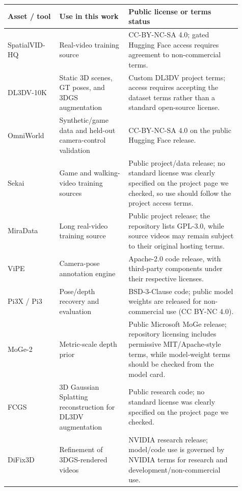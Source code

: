 \documentclass{llmxive}
\providecommand{\arraystretch}{1.10}
\begin{document}
\begin{table}[t]
  \centering
  \scriptsize
  \setlength{\tabcolsep}{3pt}
  \renewcommand{\arraystretch}{1.08}
  \begin{tabular}{@{}p{0.20\linewidth}p{0.27\linewidth}p{0.44\linewidth}@{}}
    \toprule
    \textbf{Asset / tool} & \textbf{Use in this work} & \textbf{Public license or terms status} \\
    \midrule
    SpatialVID-HQ~\citep{spatialvid} & Real-video training source & CC-BY-NC-SA 4.0; gated Hugging Face access requires agreement to non-commercial terms. \\
    DL3DV-10K~\citep{dl3dv} & Static 3D scenes, GT poses, and 3DGS augmentation & Custom DL3DV project terms; access requires accepting the dataset terms rather than a standard open-source license. \\
    OmniWorld~\citep{omniworld} & Synthetic/game data and held-out camera-control validation & CC-BY-NC-SA 4.0 on the public Hugging Face release. \\
    Sekai~\citep{sekai} & Game and walking-video training sources & Public project/data release; no standard license was clearly specified on the project page we checked, so use should follow the project access terms. \\
    MiraData~\citep{miradata} & Long real-video training source & Public project release; the repository lists GPL-3.0, while source videos may remain subject to their original hosting terms. \\
    ViPE~\citep{vipe} & Camera-pose annotation engine & Apache-2.0 code release, with third-party components under their respective licenses. \\
    Pi3X / Pi3~\citep{pi3x} & Pose/depth recovery and evaluation & BSD-3-Clause code; public model weights are released for non-commercial use (CC BY-NC 4.0). \\
    MoGe-2~\citep{moge2} & Metric-scale depth prior & Public Microsoft MoGe release; repository licensing includes permissive MIT/Apache-style terms, while model-weight terms should be checked from the model card. \\
    FCGS~\citep{fcgs} & 3D Gaussian Splatting reconstruction for DL3DV augmentation & Public research code; no standard license was clearly specified on the project page we checked. \\
    DiFix3D~\citep{difix3d} & Refinement of 3DGS-rendered videos & NVIDIA research release; model/code use is governed by NVIDIA terms for research and development/non-commercial use. \\

\end{tabular}
\end{table}
\end{document}
